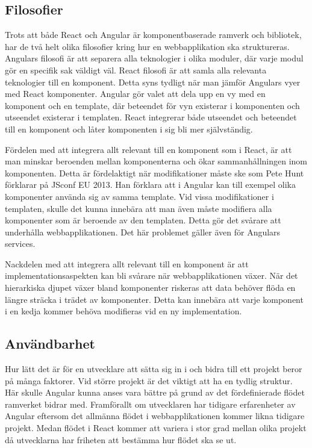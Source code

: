 \subsection{Filosofier}
Trots att både React och Angular är komponentbaserade ramverk och bibliotek, har de två helt olika filosofier kring hur en webbapplikation ska struktureras. Angulars filosofi är att separera alla teknologier i olika moduler, där varje modul gör en specifik sak väldigt väl. React filosofi är att samla alla relevanta teknologier till en komponent. Detta syns tydligt när man jämför Angulars vyer med React komponenter. Angular gör valet att dela upp en vy med en komponent och en template, där beteendet för vyn existerar i komponenten och utseendet existerar i templaten. React integrerar både utseendet och beteendet till en komponent och låter komponenten i sig bli mer självständig. 

Fördelen med att integrera allt relevant till en komponent som i React, är att man minskar beroenden mellan komponenterna och ökar sammanhållningen inom komponenten. Detta är fördelaktigt när modifikationer måste ske som Pete Hunt förklarar på JSconf EU 2013.\cite{JSConf} Han förklara att i Angular kan till exempel olika komponenter använda sig av samma template. Vid vissa modifikationer i templaten, skulle det kunna innebära att man även måste modifiera alla komponenter som är beroende av den templaten. Detta gör det svårare att underhålla webbapplikationen. Det här problemet gäller även för Angulars services.

Nackdelen med att integrera allt relevant till en komponent är att implementationsaspekten kan bli svårare när webbapplikationen växer. När det hierarkiska djupet växer bland komponenter riskeras att data behöver flöda en längre sträcka i trädet av komponenter. Detta kan innebära att varje komponent i en kedja kommer behöva modifieras vid en ny implementation.


\subsection{Användbarhet}
Hur lätt det är för en utvecklare att sätta sig in i och bidra till ett projekt beror på många faktorer. Vid större projekt är det viktigt att ha en tydlig struktur. Här skulle Angular kunna anses vara bättre på grund av det fördefinierade flödet ramverket bidrar med. Framförallt om utvecklaren har tidigare erfarenheter av Angular eftersom det allmänna flödet i webbapplikationen kommer likna tidigare projekt. Medan flödet i React kommer att variera i stor grad mellan olika projekt då utvecklarna har friheten att bestämma hur flödet ska se ut. 

